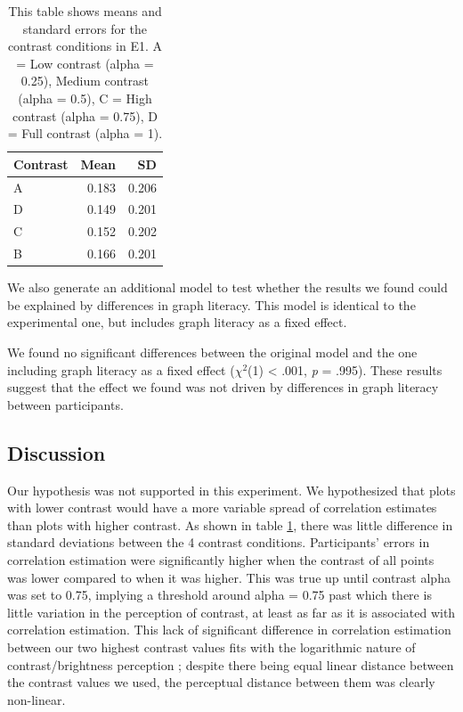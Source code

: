 \documentclass[preprint, 3p,
authoryear]{elsarticle} %
\begin{document}
\begin{table}

\caption{\label{tab:sum-stats-e1}\label{sum-stats-e1}This table shows means and standard errors for the contrast conditions in E1. A = Low contrast (alpha = 0.25), Medium contrast (alpha = 0.5), C = High contrast (alpha = 0.75), D = Full contrast (alpha = 1).}
\centering
\begin{tabular}[t]{lrr}
\toprule
Contrast & Mean & SD\\
\midrule
A & 0.183 & 0.206\\
D & 0.149 & 0.201\\
C & 0.152 & 0.202\\
B & 0.166 & 0.201\\
\bottomrule
\end{tabular}
\end{table}

We also generate an additional model to test whether the results we
found could be explained by differences in graph literacy. This model is
identical to the experimental one, but includes graph literacy as a
fixed effect.

We found no significant differences between the original model and the
one including graph literacy as a fixed effect (\(\chi^2\)(1)
\textless{} .001, \emph{p} = .995). These results suggest that the
effect we found was not driven by differences in graph literacy between
participants.

\hypertarget{discussion}{%
\subsection{Discussion}\label{discussion}}

Our hypothesis was not supported in this experiment. We hypothesized
that plots with lower contrast would have a more variable spread of
correlation estimates than plots with higher contrast. As shown in table
\ref{sum-stats-e1}, there was little difference in standard deviations
between the 4 contrast conditions. Participants' errors in correlation
estimation were significantly higher when the contrast of all points was
lower compared to when it was higher. This was true up until contrast
alpha was set to 0.75, implying a threshold around alpha = 0.75 past
which there is little variation in the perception of contrast, at least
as far as it is associated with correlation estimation. This lack of
significant difference in correlation estimation between our two highest
contrast values fits with the logarithmic nature of contrast/brightness
perception \citep{varshney_2013, fechner_1948}; despite there being
equal linear distance between the contrast values we used, the
perceptual distance between them was clearly non-linear.
\end{document}
